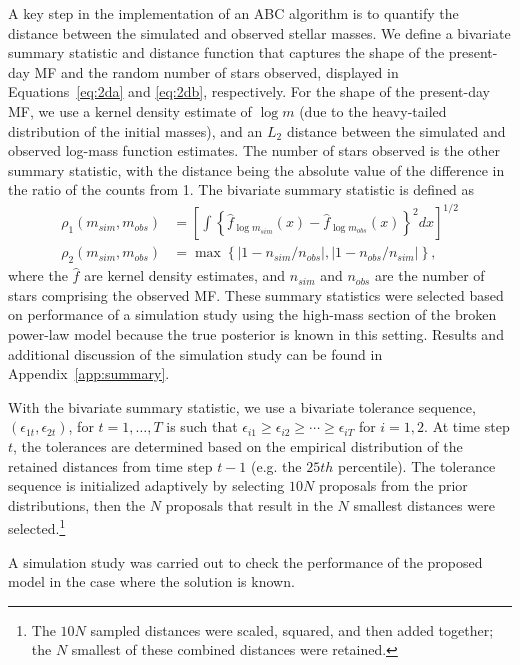 \documentclass[12pt]{article}
\begin{document}
A key step in the implementation of an ABC algorithm is to quantify the distance between the simulated and observed stellar masses.  We define a bivariate summary statistic and distance function that captures the shape of the present-day MF and the random number of stars observed, displayed in Equations~\eqref{eq:2da} and \eqref{eq:2db}, respectively.  For the shape of the present-day MF, we use a kernel density estimate of $\log m$ (due to the heavy-tailed distribution of the initial masses), and an $L_2$ distance between the simulated and observed log-mass function estimates.  The number of stars observed is the other summary statistic, with the distance being the absolute value of the difference in the ratio of the counts from 1. The bivariate summary statistic is defined as
\begin{align}
\rho_1(m_{sim}, m_{obs}) &= \left [\displaystyle \int \left \{\hat f_{\log m_{sim}}(x) - \hat f_{\log m_{obs}}(x) \right \}^2 dx \right]^{1/2} \label{eq:2da} \\ 
\rho_2(m_{sim}, m_{obs}) &= \max\left\{\left|1 - n_{sim}/ n_{obs}\right |, \left|1 - n_{obs}/ n_{sim}\right |  \right\} \text{,}   \label{eq:2db}
\end{align}
where the $\hat f$ are kernel density estimates, and $n_{sim}$ and $n_{obs}$ are the number of stars comprising the observed MF.  These summary statistics were selected based on performance of a simulation study using the high-mass section of the broken power-law model because the true posterior is known in this setting.  Results and additional discussion of the simulation study can be found in Appendix~\ref{app:summary}.

With the bivariate summary statistic, we use a bivariate tolerance sequence, $(\epsilon_{1t}, \epsilon_{2t})$, for $t = 1, \ldots, T$ is such that $\epsilon_{i1} \geq \epsilon_{i2} \geq \cdots \geq \epsilon_{iT}$ for $i = 1, 2$.  At time step $t$, the tolerances are determined based on the  empirical distribution of the retained distances from time step $t-1$ (e.g. the $25th$ percentile).  The tolerance sequence is initialized adaptively by selecting $10N$ proposals from the prior distributions, then the $N$ proposals that result in the $N$ smallest distances were selected.\footnote{The $10N$ sampled distances were scaled, squared, and then added together; the $N$ smallest of these combined distances were retained.}

A simulation study was carried out to check the performance of the proposed model in the case where the solution is known.  
\end{document}
